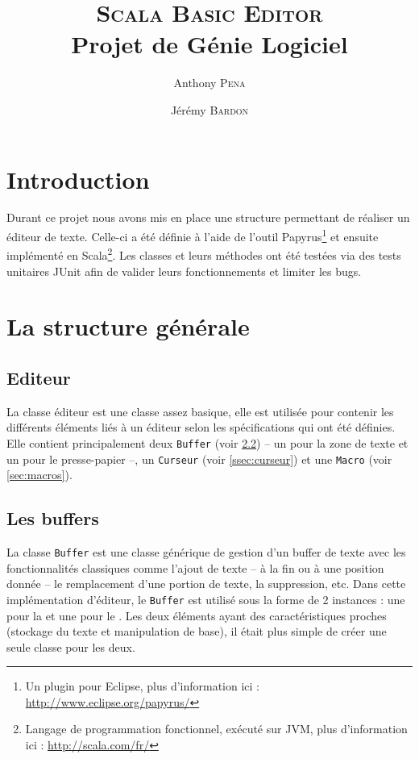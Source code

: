 \documentclass[french]{article}
\author{Anthony \textsc{Pena} \and Jérémy \textsc{Bardon}}
\title{\textsc{Scala Basic Editor}\\\normalsize{Projet de Génie Logiciel}}
\date{}
\begin{document}
\maketitle

\vspace{3cm}

\renewcommand\contentsname{Sommaire}
\tableofcontents

\newpage

\section{Introduction}

Durant ce projet nous avons mis en place une structure permettant de réaliser un éditeur de texte. Celle-ci a été définie à l'aide de l'outil Papyrus\footnote{Un plugin pour Eclipse, plus d'information ici : \url{http://www.eclipse.org/papyrus/}} et ensuite implémenté en Scala\footnote{Langage de programmation fonctionnel, exécuté sur JVM, plus d'information ici : \url{http://scala.com/fr/}}. Les classes et leurs méthodes ont été testées via des tests unitaires JUnit afin de valider leurs fonctionnements et limiter les bugs.

\section{La structure générale}

\subsection{Editeur}\label{ssec:éditeur}
La classe éditeur est une classe assez basique, elle est utilisée pour contenir les différents éléments liés à un éditeur selon les spécifications qui ont été définies. Elle contient principalement deux \texttt{Buffer} (voir \ref{ssec:buffers}) -- un pour la zone de texte et un pour le presse-papier --, un \texttt{Curseur} (voir \ref{ssec:curseur}) et une \texttt{Macro} (voir \ref{sec:macros}).

\subsection{Les buffers}\label{ssec:buffers}
La classe \texttt{Buffer} est une classe générique de gestion d'un buffer de texte avec les fonctionnalités classiques comme l'ajout de texte -- à la fin ou à une position donnée -- le remplacement d'une portion de texte, la suppression, etc. Dans cette implémentation d'éditeur, le \texttt{Buffer} est utilisé sous la forme de 2 instances : une pour la \og{}\fg{} et une pour le \og{}\fg{}. Les deux éléments ayant des caractéristiques proches (stockage du texte et manipulation de base), il était plus simple de créer une seule classe pour les deux.
\end{document}
